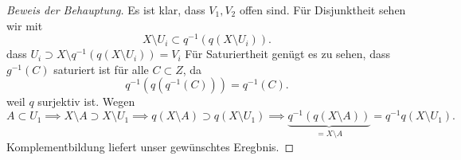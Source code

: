 \begin{proof}[Beweis der Behauptung]
    Es ist klar, dass $V_1, V_2$ offen sind. Für Disjunktheit sehen wir mit
    \[
        X \setminus U_i \subset  q^{-1}(q(X\setminus U_i))
    .\] 
    dass $U_i \supset X \setminus q^{-1}(q(X\setminus U_i)) = V_i$ 
    Für Saturiertheit genügt es zu sehen, dass $g^{-1}(C)$ saturiert ist für alle $C\subset Z$, da
    \[
        q^{-1}(q(q^{-1}(C))) = q^{-1}(C)
    .\] 
    weil $q$ surjektiv ist. Wegen
     \[
         A\subset U_1 \implies X \setminus A \supset X \setminus U_1 \implies q(X\setminus A) \supset q(X\setminus U_1) \implies \underbrace{q^{-1}(q(X\setminus A))}_{=X\setminus A} = q^{-1}q(X\setminus U_1)
    .\]
    Komplementbildung liefert unser gewünschtes Eregbnis.
\end{proof}


